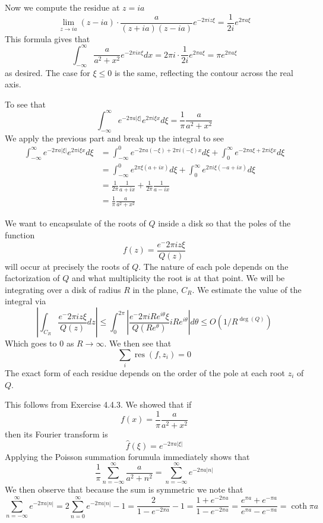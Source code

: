 \documentclass{article}
\newcommand{\exercise}[1]{\noindent{\textbf{Exercise #1:}}}
\newcommand{\res}{\operatorname{res}}
\begin{document}
Now we compute the residue at $z = ia$
\[
\lim_{z\to ia} (z-ia)\cdot \frac{a}{(z+ia)(z-ia)}e^{-2\pi iz\xi} =
\frac{1}{2i}e^{2\pi a\xi}
\]
This formula gives that
\[
\int_{-\infty}^\infty \frac{a}{a^2+x^2}e^{-2\pi ix\xi}dx = 2\pi i\cdot
\frac{1}{2i}e^{2\pi a\xi} = \pi e^{2\pi a\xi}
\]
as desired. The case for $\xi \leq 0$ is the same, reflecting the
contour across the real axis.

To see that
\[
\int_{-\infty}^\infty e^{-2\pi a|\xi|}e^{2\pi i\xi x}d\xi =
\frac{1}{\pi}\frac{a}{a^2+x^2}
\]
We apply the previous part and break up the integral to see
\begin{align*}
  \int_{-\infty}^\infty e^{-2\pi a|\xi|}e^{2\pi i\xi x}d\xi &=
  \int_{-\infty}^0 e^{-2\pi a(-\xi) + 2\pi i(-\xi) x}d\xi +
  \int_0^\infty
  e^{-2\pi a\xi+ 2\pi i\xi x}d\xi \\
  &= \int_{-\infty}^0 e^{2\pi\xi (a + ix)}d\xi + \int_0^\infty
  e^{2\pi i\xi(-a + ix)}d\xi \\
  &= \frac{1}{2\pi}\frac{1}{a+ix} + \frac{1}{2\pi}\frac{1}{a-ix} \\
  &= \frac{1}{\pi}\frac{a}{a^2+x^2}
\end{align*}

\exercise{4.4.4}

We want to encapsulate of the roots of $Q$ inside a disk so that the
poles of the function
\[
f(z) = \frac{e^-2\pi iz\xi}{Q(z)}
\]
will occur at precisely the roots of $Q$. The nature of each pole
depends on the factorization of $Q$ and what multiplicity the root is
at that point. We will be integrating over a disk of radius $R$ in the
plane, $C_R$. We estimate the value of the integral via
\[
\left|\int_{C_R} \frac{e^-2\pi iz\xi}{Q(z)}dz\right| \leq
\int_0^{2\pi}\left|\frac{e^-2\pi
    iRe^{i\theta}\xi}{Q(Re^{\theta})}iRe^{i\theta}\right|d\theta \leq
O(1/R^{\deg(Q)})
\]
Which goes to $0$ as $R \to \infty$. We then see that
\[
\sum_i \res(f, z_i) = 0
\]
The exact form of each residue depends on the order of the pole at
each root $z_i$ of $Q$.

\exercise{4.4.6}

This follows from Exercise 4.4.3. We showed that if
\[
f(x) = \frac{1}{\pi}\frac{a}{a^2+x^2}
\]
then its Fourier transform is
\[
\hat{f}(\xi) = e^{-2\pi a|\xi|}
\]
Applying the Poisson summation forumula immediately shows that
\[
\frac{1}{\pi}\sum_{n=-\infty}^\infty \frac{a}{a^2+n^2} =
\sum_{n=-\infty}^\infty e^{-2\pi a|n|}
\]
We then observe that because the sum is symmetric we note that
\[
\sum_{n=-\infty}^\infty e^{-2\pi a|n|} = 2\sum_{n=0}^\infty e^{-2\pi
  a|n|} - 1 = \frac{2}{1-e^{-2\pi a}} - 1 = \frac{1 + e^{-2\pi
    a}}{1-e^{-2\pi a}} = \frac{e^{\pi a} + e^{-\pi a}}{e^{\pi
    a}-e^{-\pi a}} = \coth \pi a
\]
\end{document}
